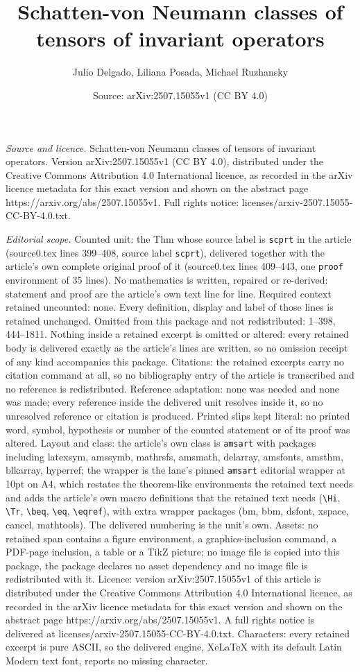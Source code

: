 \documentclass[10pt,a4paper]{amsart}
\title[Schatten-von Neumann classes of tensors of invariant operato]{Schatten-von Neumann classes of tensors of invariant operators}
\author{Julio Delgado, Liliana Posada, Michael Ruzhansky}
\date{Source: arXiv:2507.15055v1 (CC BY 4.0)}
\begin{document}
\maketitle

\noindent\emph{Source and licence.} Schatten-von Neumann classes of tensors of invariant operators. Version arXiv:2507.15055v1 (CC BY 4.0), distributed under the Creative Commons Attribution 4.0 International licence, as recorded in the arXiv licence metadata for this exact version and shown on the abstract page https://arxiv.org/abs/2507.15055v1. Full rights notice: licenses/arxiv-2507.15055-CC-BY-4.0.txt.\par\smallskip

\noindent\textit{Editorial scope.} Counted unit: the Thm whose source label is \texttt{scprt} in the article (source0.tex lines 399--408, source label \texttt{scprt}), delivered together with the article's own complete original proof of it (source0.tex lines 409--443, one \texttt{proof} environment of 35 lines). No mathematics is written, repaired or re-derived: statement and proof are the article's own text line for line. Required context retained uncounted: none. Every definition, display and label of those lines is retained unchanged. Omitted from this package and not redistributed: 1--398, 444--1811. Nothing inside a retained excerpt is omitted or altered: every retained body is delivered exactly as the article's lines are written, so no omission receipt of any kind accompanies this package. Citations: the retained excerpts carry no citation command at all, so no bibliography entry of the article is transcribed and no reference is redistributed. Reference adaptation: none was needed and none was made; every reference inside the delivered unit resolves inside it, so no unresolved reference or citation is produced. Printed slips kept literal: no printed word, symbol, hypothesis or number of the counted statement or of its proof was altered. Layout and class: the article's own class is \texttt{amsart} with packages including latexsym, amssymb, mathrsfs, amsmath, delarray, amsfonts, amsthm, blkarray, hyperref; the wrapper is the lane's pinned \texttt{amsart} editorial wrapper at 10pt on A4, which restates the theorem-like environments the retained text needs and adds the article's own macro definitions that the retained text needs (\texttt{\textbackslash Hi}, \texttt{\textbackslash Tr}, \texttt{\textbackslash beq}, \texttt{\textbackslash eq}, \texttt{\textbackslash eqref}), with extra wrapper packages (bm, bbm, dsfont, xspace, cancel, mathtools). The delivered numbering is the unit's own. Assets: no retained span contains a figure environment, a graphics-inclusion command, a PDF-page inclusion, a table or a TikZ picture; no image file is copied into this package, the package declares no asset dependency and no image file is redistributed with it. Licence: version arXiv:2507.15055v1 of this article is distributed under the Creative Commons Attribution 4.0 International licence, as recorded in the arXiv licence metadata for this exact version and shown on the abstract page https://arxiv.org/abs/2507.15055v1. A full rights notice is delivered at licenses/arxiv-2507.15055-CC-BY-4.0.txt. Characters: every retained excerpt is pure ASCII, so the delivered engine, XeLaTeX with its default Latin Modern text font, reports no missing character.
\end{document}
